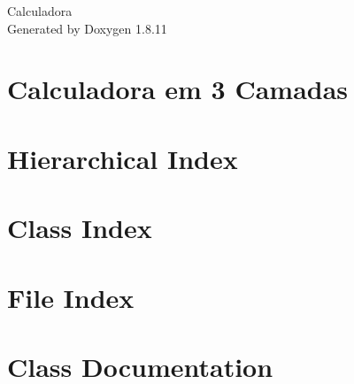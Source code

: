 \documentclass[twoside]{book}
\newcommand{\+}{\discretionary{\mbox{\scriptsize$\hookleftarrow$}}{}{}}
\newcommand{\clearemptydoublepage}{%
  \newpage{\pagestyle{empty}\cleardoublepage}%
}
\begin{document}
\hypersetup{pageanchor=false,
             bookmarksnumbered=true,
             pdfencoding=unicode
            }
\begin{titlepage}
\vspace*{7cm}
\begin{center}%
{\Large Calculadora }\\
\vspace*{1cm}
{\large Generated by Doxygen 1.8.11}\\
\end{center}
\end{titlepage}
\clearemptydoublepage
\tableofcontents
\clearemptydoublepage
{}
\hypersetup{pageanchor=true}

\chapter{Calculadora em 3 Camadas}
\label{index}\hypertarget{index}{}
\chapter{Hierarchical Index}

\chapter{Class Index}

\chapter{File Index}

\chapter{Class Documentation}



















\end{document}
